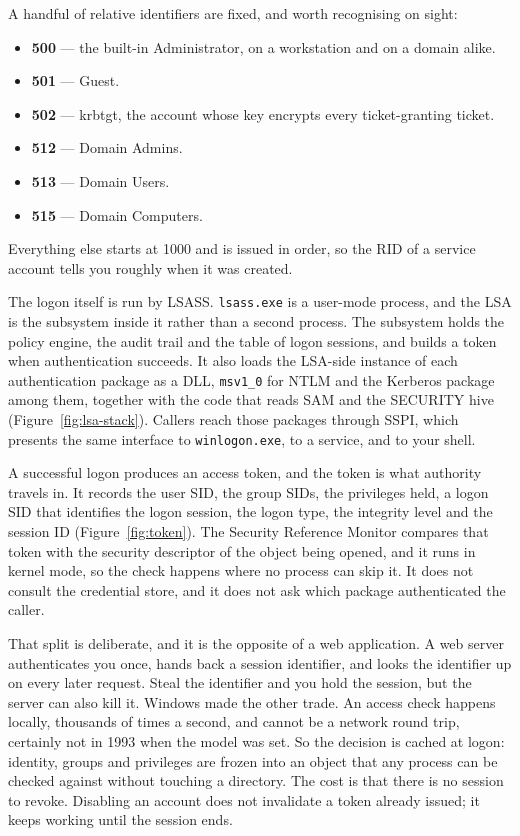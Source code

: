 

A handful of relative identifiers are fixed, and worth recognising on sight:

\begin{itemize}[leftmargin=1.6em]
  \item \textbf{500} --- the built-in Administrator, on a workstation and on a domain alike.
  \item \textbf{501} --- Guest.
  \item \textbf{502} --- krbtgt, the account whose key encrypts every \mbox{ticket-granting} ticket.
  \item \textbf{512} --- Domain Admins.
  \item \textbf{513} --- Domain Users.
  \item \textbf{515} --- Domain Computers.
\end{itemize}

Everything else starts at 1000 and is issued in order, so the RID of a service account tells you
roughly when it was created.

The logon itself is run by LSASS. \texttt{lsass.exe} is a user-mode process, and the LSA is the
subsystem inside it rather than a second process. The subsystem holds the policy engine, the audit
trail and the table of logon sessions, and builds a token when authentication succeeds. It also
loads the LSA-side instance of each authentication package as a DLL, \texttt{msv1\_0} for NTLM and
the Kerberos package among them, together with the code that reads SAM and the SECURITY hive
(Figure~\ref{fig:lsa-stack}). Callers reach those packages through SSPI, which presents the same
interface to \texttt{winlogon.exe}, to a service, and to your shell.



A successful logon produces an access token, and the token is what authority travels in. It
records the user SID, the group SIDs, the privileges held, a logon SID that identifies the logon
session, the logon type, the integrity level and the session ID (Figure~\ref{fig:token}). The
Security Reference Monitor compares that token with the security descriptor of the object being
opened, and it runs in kernel mode, so the check happens where no process can skip it. It does not
consult the credential store, and it does not ask which package authenticated the caller.



That split is deliberate, and it is the opposite of a web application. A web server authenticates
you once, hands back a session identifier, and looks the identifier up on every later request.
Steal the identifier and you hold the session, but the server can also kill it. Windows made the
other trade. An access check happens locally, thousands of times a second, and cannot be a
network round trip, certainly not in 1993 when the model was set. So the decision is cached at
logon: identity, groups and privileges are frozen into an object that any process can be checked
against without touching a directory. The cost is that there is no session to revoke. Disabling an
account does not invalidate a token already issued; it keeps working until the session ends.

